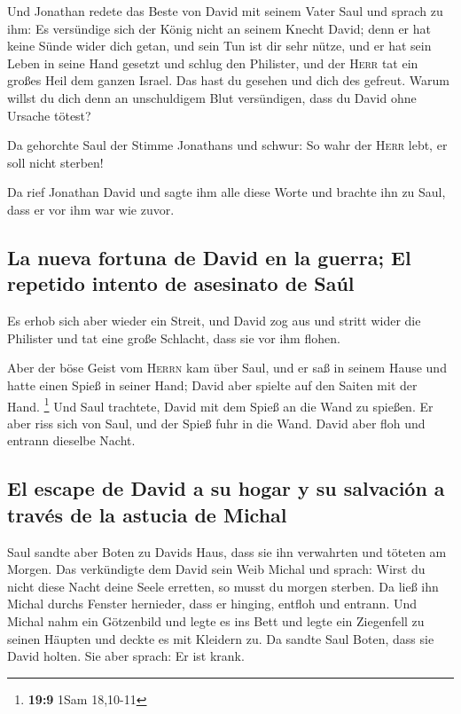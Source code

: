  Und Jonathan redete das Beste von David mit seinem Vater
Saul und sprach zu ihm: Es versündige sich der König nicht an seinem
Knecht David; denn er hat keine Sünde wider dich getan, und sein Tun ist
dir sehr nütze,  und er hat sein Leben in seine Hand
gesetzt und schlug den Philister, und der \textsc{Herr} tat ein großes
Heil dem ganzen Israel. Das hast du gesehen und dich des gefreut. Warum
willst du dich denn an unschuldigem Blut versündigen, dass du David ohne
Ursache tötest?

 Da gehorchte Saul der Stimme Jonathans und schwur: So
wahr der \textsc{Herr} lebt, er soll nicht sterben!

 Da rief Jonathan David und sagte ihm alle diese Worte und
brachte ihn zu Saul, dass er vor ihm war wie zuvor.

\hypertarget{la-nueva-fortuna-de-david-en-la-guerra-el-repetido-intento-de-asesinato-de-sauxfal}{%
\subsection{La nueva fortuna de David en la guerra; El repetido intento
de asesinato de
Saúl}\label{la-nueva-fortuna-de-david-en-la-guerra-el-repetido-intento-de-asesinato-de-sauxfal}}

 Es erhob sich aber wieder ein Streit, und David zog aus
und stritt wider die Philister und tat eine große Schlacht, dass sie vor
ihm flohen.

 Aber der böse Geist vom \textsc{Herrn} kam über Saul, und
er saß in seinem Hause und hatte einen Spieß in seiner Hand; David aber
spielte auf den Saiten mit der Hand. \footnote{\textbf{19:9} 1Sam
  18,10-11}  Und Saul trachtete, David mit dem Spieß an
die Wand zu spießen. Er aber riss sich von Saul, und der Spieß fuhr in
die Wand. David aber floh und entrann dieselbe Nacht.

\hypertarget{el-escape-de-david-a-su-hogar-y-su-salvaciuxf3n-a-travuxe9s-de-la-astucia-de-michal}{%
\subsection{El escape de David a su hogar y su salvación a través de la
astucia de
Michal}\label{el-escape-de-david-a-su-hogar-y-su-salvaciuxf3n-a-travuxe9s-de-la-astucia-de-michal}}

 Saul sandte aber Boten zu Davids Haus, dass sie ihn
verwahrten und töteten am Morgen. Das verkündigte dem David sein Weib
Michal und sprach: Wirst du nicht diese Nacht deine Seele erretten, so
musst du morgen sterben.  Da ließ ihn Michal durchs
Fenster hernieder, dass er hinging, entfloh und entrann. 
Und Michal nahm ein Götzenbild und legte es ins Bett und legte ein
Ziegenfell zu seinen Häupten und deckte es mit Kleidern zu.
 Da sandte Saul Boten, dass sie David holten. Sie aber
sprach: Er ist krank.

